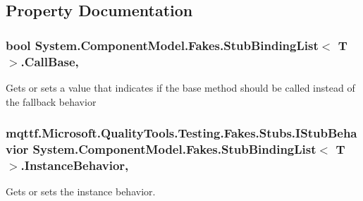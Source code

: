 \subsection{Property Documentation}
\hypertarget{class_system_1_1_component_model_1_1_fakes_1_1_stub_binding_list_3_01_t_01_4_a1b70d02104a2c45f3fbef275e275da99}{
\subsubsection[{Call\-Base}]{\setlength{\rightskip}{0pt plus 5cm}bool System.\-Component\-Model.\-Fakes.\-Stub\-Binding\-List$<$ T $>$.Call\-Base\hspace{0.3cm}{\ttfamily [get]}, {\ttfamily [set]}}}\label{class_system_1_1_component_model_1_1_fakes_1_1_stub_binding_list_3_01_t_01_4_a1b70d02104a2c45f3fbef275e275da99}


Gets or sets a value that indicates if the base method should be called instead of the fallback behavior

\hypertarget{class_system_1_1_component_model_1_1_fakes_1_1_stub_binding_list_3_01_t_01_4_a652c677a19e7f29b96d40663c845df57}{
\subsubsection[{Instance\-Behavior}]{\setlength{\rightskip}{0pt plus 5cm}mqttf.\-Microsoft.\-Quality\-Tools.\-Testing.\-Fakes.\-Stubs.\-I\-Stub\-Behavior System.\-Component\-Model.\-Fakes.\-Stub\-Binding\-List$<$ T $>$.Instance\-Behavior\hspace{0.3cm}{\ttfamily [get]}, {\ttfamily [set]}}}\label{class_system_1_1_component_model_1_1_fakes_1_1_stub_binding_list_3_01_t_01_4_a652c677a19e7f29b96d40663c845df57}


Gets or sets the instance behavior.


